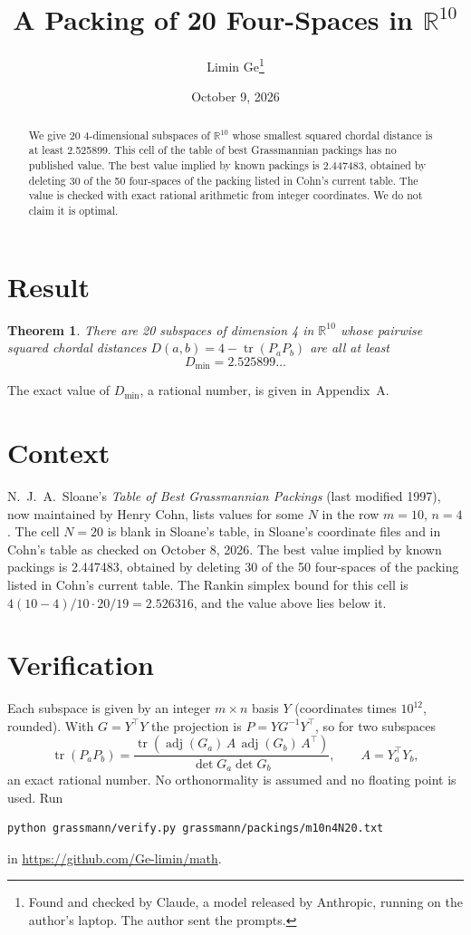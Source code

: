 \documentclass[11pt,a4paper]{article}
\title{A Packing of 20 Four-Spaces in $\mathbb{R}^{10}$}
\author{Limin Ge\thanks{Found and checked by Claude, a model released by Anthropic, running on the author's laptop. The author sent the prompts.}}
\date{October 9, 2026}
\newtheorem*{theorem}{Theorem}
\begin{document}
\maketitle
\begin{abstract}
We give 20 4-dimensional subspaces of $\mathbb{R}^{10}$ whose smallest squared chordal distance is at least 2.525899. This cell of the table of best Grassmannian packings has no published value. The best value implied by known packings is 2.447483, obtained by deleting 30 of the 50 four-spaces of the packing listed in Cohn's current table. The value is checked with exact rational arithmetic from integer coordinates. We do not claim it is optimal.
\end{abstract}

\section{Result}
\begin{theorem}
There are 20 subspaces of dimension 4 in $\mathbb{R}^{10}$ whose pairwise squared chordal distances $D(a,b) = 4 - \operatorname{tr}(P_aP_b)$ are all at least
\[ D_{\min} = 2.525899\ldots \]
\end{theorem}
The exact value of $D_{\min}$, a rational number, is given in Appendix~A.


\section{Context}
N.~J.~A.~Sloane's \emph{Table of Best Grassmannian Packings} (last modified 1997), now maintained by Henry Cohn, lists values for some $N$ in the row $m=10$, $n=4$. The cell $N=20$ is blank in Sloane's table, in Sloane's coordinate files and in Cohn's table as checked on October 8, 2026. The best value implied by known packings is 2.447483, obtained by deleting 30 of the 50 four-spaces of the packing listed in Cohn's current table. The Rankin simplex bound for this cell is $4(10-4)/10\cdot 20/19 = 2.526316$, and the value above lies below it.


\section{Verification}
Each subspace is given by an integer $m\times n$ basis $Y$ (coordinates times $10^{12}$, rounded). With $G=Y^\top Y$ the projection is $P=YG^{-1}Y^\top$, so for two subspaces
\[ \operatorname{tr}(P_aP_b)=\frac{\operatorname{tr}(\operatorname{adj}(G_a)\,A\,\operatorname{adj}(G_b)\,A^\top)}{\det G_a\det G_b},\qquad A=Y_a^\top Y_b, \]
an exact rational number. No orthonormality is assumed and no floating point is used. Run
\begin{verbatim}
python grassmann/verify.py grassmann/packings/m10n4N20.txt
\end{verbatim}
in \url{https://github.com/Ge-limin/math}.
\end{document}

